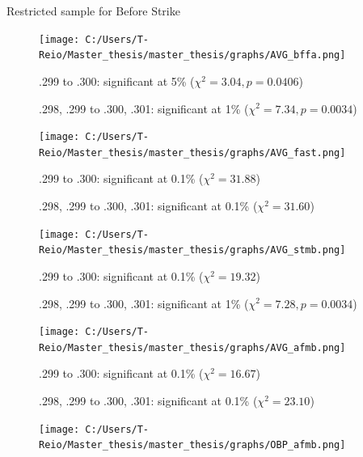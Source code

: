 \documentclass[dvipdfmx,12pt]{beamer}
\begin{document}
\begin{frame}
  \scriptsize
  Restricted sample for Before Strike

  \begin{figure}
    \texttt{[image: C:/Users/T-Reio/Master\_thesis/master\_thesis/graphs/AVG\_bffa.png]}
    \label{}
    \footnotesize

    .299 to .300: significant at 5\% ($\chi^2 = 3.04, p = 0.0406$)

   .298, .299 to .300, .301: significant at 1\% ($\chi^2 = 7.34, p = 0.0034$)
  \end{figure}
\end{frame}

\begin{frame}

  \begin{figure}
    \texttt{[image: C:/Users/T-Reio/Master\_thesis/master\_thesis/graphs/AVG\_fast.png]}
    \label{}
    \footnotesize

    .299 to .300: significant at 0.1\% ($\chi^2 = 31.88$)

   .298, .299 to .300, .301: significant at 0.1\% ($\chi^2 = 31.60$)
  \end{figure}
\end{frame}

\begin{frame}
  \begin{figure}
    \texttt{[image: C:/Users/T-Reio/Master\_thesis/master\_thesis/graphs/AVG\_stmb.png]}
    \label{}
    \footnotesize

    .299 to .300: significant at 0.1\% ($\chi^2 = 19.32$)

   .298, .299 to .300, .301: significant at 1\% ($\chi^2 = 7.28, p = 0.0034$)
  \end{figure}
\end{frame}

\begin{frame}
  \begin{figure}
    \texttt{[image: C:/Users/T-Reio/Master\_thesis/master\_thesis/graphs/AVG\_afmb.png]}
    \label{}
    \footnotesize

    .299 to .300: significant at 0.1\% ($\chi^2 = 16.67$)

   .298, .299 to .300, .301: significant at 0.1\% ($\chi^2 = 23.10$)
  \end{figure}
\end{frame}

\begin{frame}
  \begin{figure}
    \texttt{[image: C:/Users/T-Reio/Master\_thesis/master\_thesis/graphs/OBP\_afmb.png]}
    \label{}
  \end{figure}
\end{frame}
\end{document}
